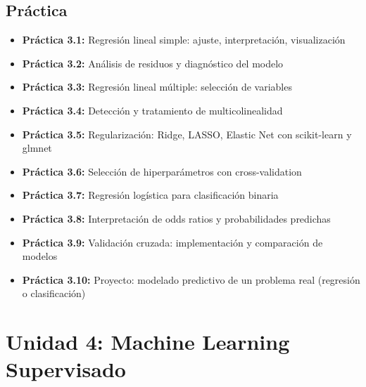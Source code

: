 \documentclass[a4paper,11pt]{article}
\begin{document}
\subsection{Práctica}
\begin{itemize}[leftmargin=*, labelindent=0pt, label={\textcolor{practicacolor}{$\blacktriangleright$}}]
    \item \textbf{Práctica 3.1:} Regresión lineal simple: ajuste, interpretación, visualización
    \item \textbf{Práctica 3.2:} Análisis de residuos y diagnóstico del modelo
    \item \textbf{Práctica 3.3:} Regresión lineal múltiple: selección de variables
    \item \textbf{Práctica 3.4:} Detección y tratamiento de multicolinealidad
    \item \textbf{Práctica 3.5:} Regularización: Ridge, LASSO, Elastic Net con scikit-learn y glmnet
    \item \textbf{Práctica 3.6:} Selección de hiperparámetros con cross-validation
    \item \textbf{Práctica 3.7:} Regresión logística para clasificación binaria
    \item \textbf{Práctica 3.8:} Interpretación de odds ratios y probabilidades predichas
    \item \textbf{Práctica 3.9:} Validación cruzada: implementación y comparación de modelos
    \item \textbf{Práctica 3.10:} Proyecto: modelado predictivo de un problema real (regresión o clasificación)
\end{itemize}

\section{Unidad 4: Machine Learning Supervisado}
\end{document}
